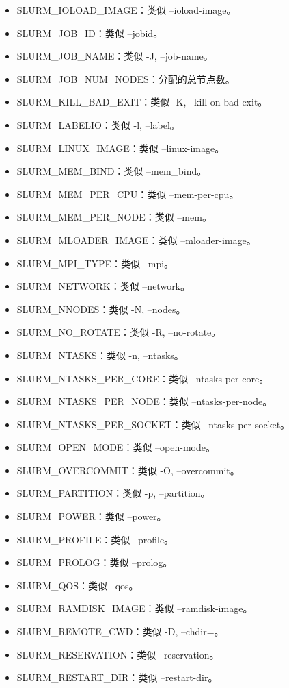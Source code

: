 \begin{itemize}
	\item SLURM\_IOLOAD\_IMAGE：类似 --ioload-image。
	\item SLURM\_JOB\_ID：类似 --jobid。
	\item SLURM\_JOB\_NAME：类似 -J, --job-name。
	\item SLURM\_JOB\_NUM\_NODES：分配的总节点数。
	\item SLURM\_KILL\_BAD\_EXIT：类似 -K, --kill-on-bad-exit。
	\item SLURM\_LABELIO：类似 -l, --label。
	\item SLURM\_LINUX\_IMAGE：类似 --linux-image。
	\item SLURM\_MEM\_BIND：类似 --mem\_bind。
	\item SLURM\_MEM\_PER\_CPU：类似 --mem-per-cpu。
	\item SLURM\_MEM\_PER\_NODE：类似 --mem。
	\item SLURM\_MLOADER\_IMAGE：类似 --mloader-image。
	\item SLURM\_MPI\_TYPE：类似 --mpi。
	\item SLURM\_NETWORK：类似 --network。
	\item SLURM\_NNODES：类似 -N, --nodes。
	\item SLURM\_NO\_ROTATE：类似 -R, --no-rotate。
	\item SLURM\_NTASKS：类似 -n, --ntasks。
	\item SLURM\_NTASKS\_PER\_CORE：类似 --ntasks-per-core。
	\item SLURM\_NTASKS\_PER\_NODE：类似 --ntasks-per-node。
	\item SLURM\_NTASKS\_PER\_SOCKET：类似 --ntasks-per-socket。
	\item SLURM\_OPEN\_MODE：类似 --open-mode。
	\item SLURM\_OVERCOMMIT：类似 -O, --overcommit。
	\item SLURM\_PARTITION：类似 -p, --partition。
	\item SLURM\_POWER：类似 --power。
	\item SLURM\_PROFILE：类似 --profile。
	\item SLURM\_PROLOG：类似 --prolog。
	\item SLURM\_QOS：类似 --qos。
	\item SLURM\_RAMDISK\_IMAGE：类似 --ramdisk-image。
	\item SLURM\_REMOTE\_CWD：类似 -D, --chdir=。
	\item SLURM\_RESERVATION：类似 --reservation。
	\item SLURM\_RESTART\_DIR：类似 --restart-dir。

\end{itemize}
